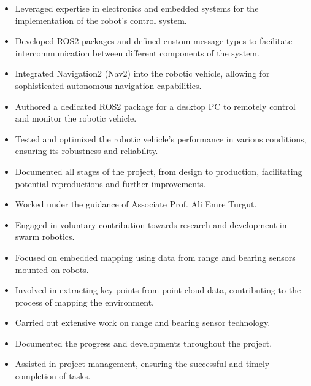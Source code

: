 \documentclass[10pt,a4paper,ragged2e,withhyper]{altacv}
\begin{document}
\begin{paracol}{2}
\begin{itemize}
  \item Leveraged expertise in electronics and embedded systems for the implementation of the robot's control system.
  \item Developed ROS2 packages and defined custom message types to facilitate intercommunication between different components of the system.
  \item Integrated Navigation2 (Nav2) into the robotic vehicle, allowing for sophisticated autonomous navigation capabilities.
  \item Authored a dedicated ROS2 package for a desktop PC to remotely control and monitor the robotic vehicle.
  \item Tested and optimized the robotic vehicle's performance in various conditions, ensuring its robustness and reliability.
  \item Documented all stages of the project, from design to production, facilitating potential reproductions and further improvements.
\end{itemize}

\divider

\begin{itemize}
  \item Worked under the guidance of Associate Prof. Ali Emre Turgut.
  \item Engaged in voluntary contribution towards research and development in swarm robotics.
  \item Focused on embedded mapping using data from range and bearing sensors mounted on robots.
  \item Involved in extracting key points from point cloud data, contributing to the process of mapping the environment.
  \item Carried out extensive work on range and bearing sensor technology.
  \item Documented the progress and developments throughout the project.
  \item Assisted in project management, ensuring the successful and timely completion of tasks.
\end{itemize}


\medskip





\end{paracol}
\end{document}
